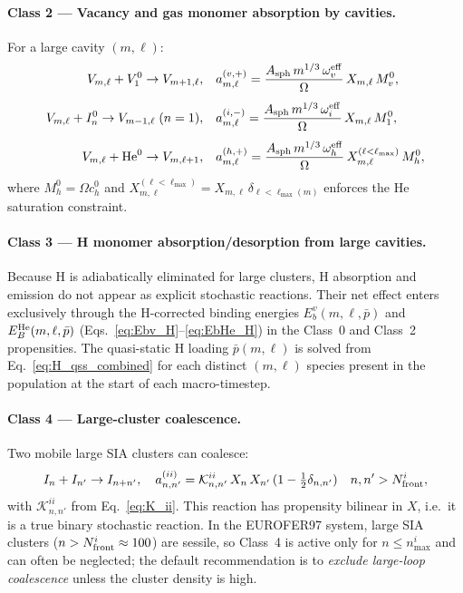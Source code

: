 \paragraph{Class 2 --- Vacancy and gas monomer absorption by cavities.}
For a large cavity $(m,\ell)$:
\begin{align}
    V_{m,\ell} + V_1^0 \to V_{m+1,\ell},
    &\quad
    a_{m,\ell}^{(v,+)}
    = \frac{A_{\rm sph}\,m^{1/3}\,\omega_v^{\rm eff}}{\Omega}\,
      X_{m,\ell}\,M_v^0,
    \label{eq:r2_v}\\[4pt]
    V_{m,\ell} + I_n^0 \to V_{m-1,\ell} \;(n=1),
    &\quad
    a_{m,\ell}^{(i,-)}
    = \frac{A_{\rm sph}\,m^{1/3}\,\omega_i^{\rm eff}}{\Omega}\,
      X_{m,\ell}\,M_1^0,
    \label{eq:r2_i}\\[4pt]
    V_{m,\ell} + \mathrm{He}^0 \to V_{m,\ell+1},
    &\quad
    a_{m,\ell}^{(h,+)}
    = \frac{A_{\rm sph}\,m^{1/3}\,\omega_h^{\rm eff}}{\Omega}\,
      X_{m,\ell}^{(\ell < \ell_{\max})}\,M_h^0,
    \label{eq:r2_h}
\end{align}
where $M_h^0 = \Omega c_h^0$ and
$X_{m,\ell}^{(\ell < \ell_{\max})} = X_{m,\ell}\,
\delta_{\ell < \ell_{\max}(m)}$ enforces the He saturation
constraint.

\paragraph{Class 3 --- H monomer absorption/desorption from large
cavities.}
Because H is adiabatically eliminated for large clusters, H
absorption and emission do not appear as explicit stochastic
reactions.  Their net effect enters exclusively through the
H-corrected binding energies
$E_b^v(m,\ell,\bar{p})$ and $E_B^{\rm He}(m,\ell,\bar{p})$
(Eqs.~\ref{eq:Ebv_H}--\ref{eq:EbHe_H}) in the Class~0 and
Class~2 propensities.  The quasi-static H loading
$\bar{p}(m,\ell)$ is solved from Eq.~\eqref{eq:H_qss_combined}
for each distinct $(m,\ell)$ species present in the population
at the start of each macro-timestep.

\paragraph{Class 4 --- Large-cluster coalescence.}
Two mobile large SIA clusters can coalesce:
\begin{equation}\label{eq:r4_coal}
    I_n + I_{n'} \to I_{n+n'},
    \quad
    a_{n,n'}^{(ii)}
    = \mathcal{K}_{n,n'}^{ii}\,X_n\,X_{n'}\,(1 - \tfrac{1}{2}\delta_{n,n'})
    \quad
    n,n' > N_{\rm front}^i,
\end{equation}
with $\mathcal{K}_{n,n'}^{ii}$ from Eq.~\eqref{eq:K_ii}.  This
reaction has propensity bilinear in $X$, i.e.\ it is a true
binary stochastic reaction.  In the EUROFER97 system, large SIA
clusters ($n > N_{\rm front}^i \approx 100$) are sessile, so
Class~4 is active only for $n \leq n_{\max}^i$ and can often be
neglected; the default recommendation is to \emph{exclude
large-loop coalescence} unless the cluster density is high.

